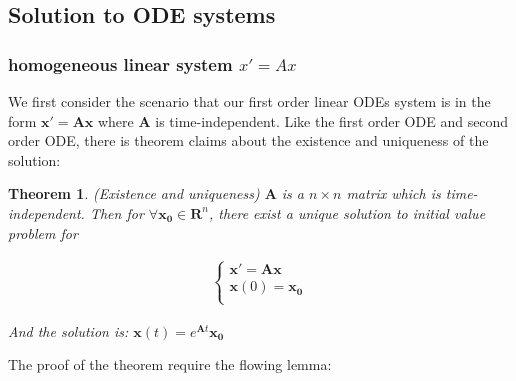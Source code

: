 \documentclass[a4paper]{article}
\newtheorem{theorem}{Theorem}
\begin{document}
\subsection{Solution to ODE systems}
\subsubsection{homogeneous linear system $x'=Ax$}
We first consider the scenario that our first order linear ODEs system is in the form $\mathbf{x'=Ax}$ where $\mathbf{A}$ is time-independent. Like the first order ODE and second order ODE, there is theorem claims about the existence and uniqueness of the solution:
\begin{theorem}
(Existence and uniqueness) $\mathbf{A}$ is a $n\times n$ matrix which is time-independent. Then for $\forall {{\mathbf{x}}_{\mathbf{0}}}\in {{\mathbf{R}}^{n}}$, there exist a unique solution to initial value problem for

\begin{eqnarray}     %
\left\{                        %
\begin{array}{lll}       %
\mathbf{x}'\mathbf{=Ax} \\
\mathbf{x}(0)={{\mathbf{x}}_{\mathbf{0}}} \\
\end{array}              %
\right.                       %
\end{eqnarray}

And the solution is:
$\mathbf{x}(t)={{e}^{\mathbf{A}t}}{{\mathbf{x}}_{\mathbf{0}}}$
\end{theorem}
The proof of the theorem require the flowing lemma:
\end{document}
